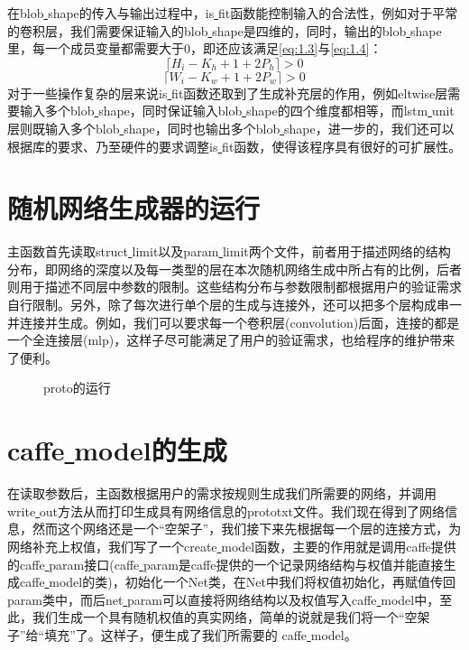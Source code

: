 在blob\underline{ }shape的传入与输出过程中，is\underline{ }fit函数能控制输入的合法性，例如对于平常的卷积层，我们需要保证输入的blob\underline{ }shape是四维的，同时，输出的blob\underline{ }shape里，每一个成员变量都需要大于0，即还应该满足\autoref{eq:1.3}与\autoref{eq:1.4}：
\begin{equation}\label{eq:1.3}
\lceil H_{i}-K_h+1+2P_{h}\rceil >0
\end{equation}
\begin{equation}\label{eq:1.4}
\lceil W_{i}-K_w+1+2P_{w}\rceil >0
\end{equation}
对于一些操作复杂的层来说is\underline{ }fit函数还取到了生成补充层的作用，例如eltwise层需要输入多个blob\underline{ }shape，同时保证输入blob\underline{ }shape的四个维度都相等，而lstm\underline{ }unit层则既输入多个blob\underline{ }shape，同时也输出多个blob\underline{ }shape，进一步的，我们还可以根据库的要求、乃至硬件的要求调整is\underline{ }fit函数，使得该程序具有很好的可扩展性。

\section{随机网络生成器的运行}
主函数首先读取struct\underline{ }limit以及param\underline{ }limit两个文件，前者用于描述网络的结构分布，即网络的深度以及每一类型的层在本次随机网络生成中所占有的比例，后者则用于描述不同层中参数的限制。这些结构分布与参数限制都根据用户的验证需求自行限制。另外，除了每次进行单个层的生成与连接外，还可以把多个层构成串一并连接并生成。例如，我们可以要求每一个卷积层(convolution)后面，连接的都是一个全连接层(mlp)，这样子尽可能满足了用户的验证需求，也给程序的维护带来了便利。

\begin{figure}[!htbp]
\centering 
{}
\caption{proto的运行}
\label{fig:limit}
\end{figure}
\section{caffe\underline{ }model的生成}

在读取参数后，主函数根据用户的需求按规则生成我们所需要的网络，并调用write\underline{ }out方法从而打印生成具有网络信息的prototxt文件。我们现在得到了网络信息，然而这个网络还是一个“空架子”，我们接下来先根据每一个层的连接方式，为网络补充上权值，我们写了一个create\underline{ }model函数，主要的作用就是调用caffe提供的caffe\underline{ }param接口(caffe\underline{ }param是caffe提供的一个记录网络结构与权值并能直接生成caffe\underline{ }model的类)，初始化一个Net类，在Net中我们将权值初始化，再赋值传回param类中，而后net\underline{ }param可以直接将网络结构以及权值写入caffe\underline{ }model中，至此，我们生成一个具有随机权值的真实网络，简单的说就是我们将一个“空架子”给“填充”了。这样子，便生成了我们所需要的 caffe\underline{ }model。

